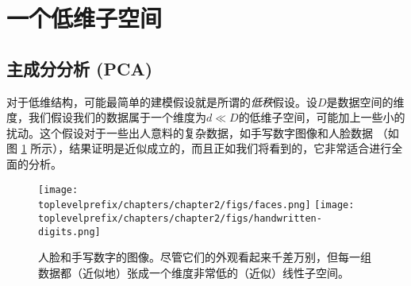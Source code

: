 \documentclass[../../book-main_zh.tex]{subfiles}
\begin{document}








\section{一个低维子空间} \label{sec:lowrank}

\subsection{主成分分析 (PCA)} \label{sub:pca}

对于低维结构，可能最简单的建模假设就是所谓的\textit{低秩}假设。设\(D\)是数据空间的维度，我们假设我们的数据属于一个维度为\(d \ll D\)的低维子空间，可能加上一些小的扰动。这个假设对于一些出人意料的复杂数据，如手写数字图像和人脸数据 \cite{BasriR2003-PAMI}（如图 \ref{fig:faces-digits} 所示），结果证明是近似成立的，而且正如我们将看到的，它非常适合进行全面的分析。

\begin{figure}
    \centering
    \texttt{[image: \\toplevelprefix/chapters/chapter2/figs/faces.png]}
    \hspace{5mm} \texttt{[image: \\toplevelprefix/chapters/chapter2/figs/handwritten-digits.png]}   
    \caption{人脸和手写数字的图像。尽管它们的外观看起来千差万别，但每一组数据都（近似地）张成一个维度非常低的（近似）线性子空间。}
    \label{fig:faces-digits}
\end{figure}
\end{document}
